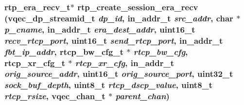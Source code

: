 \subsubsection{\setlength{\rightskip}{0pt plus 5cm}\bf{rtp\_\-era\_\-recv\_\-t}$\ast$ rtp\_\-create\_\-session\_\-era\_\-recv (vqec\_\-dp\_\-streamid\_\-t {\em dp\_\-id}, in\_\-addr\_\-t {\em src\_\-addr}, char $\ast$ {\em p\_\-cname}, in\_\-addr\_\-t {\em era\_\-dest\_\-addr}, uint16\_\-t {\em recv\_\-rtcp\_\-port}, uint16\_\-t {\em send\_\-rtcp\_\-port}, in\_\-addr\_\-t {\em fbt\_\-ip\_\-addr}, rtcp\_\-bw\_\-cfg\_\-t $\ast$ {\em rtcp\_\-bw\_\-cfg}, rtcp\_\-xr\_\-cfg\_\-t $\ast$ {\em rtcp\_\-xr\_\-cfg}, in\_\-addr\_\-t {\em orig\_\-source\_\-addr}, uint16\_\-t {\em orig\_\-source\_\-port}, uint32\_\-t {\em sock\_\-buf\_\-depth}, uint8\_\-t {\em rtcp\_\-dscp\_\-value}, uint8\_\-t {\em rtcp\_\-rsize}, \bf{vqec\_\-chan\_\-t} $\ast$ {\em parent\_\-chan})}\label{rtp__era__recv_8h_3e351495e95228ec851dffe4293af997}


